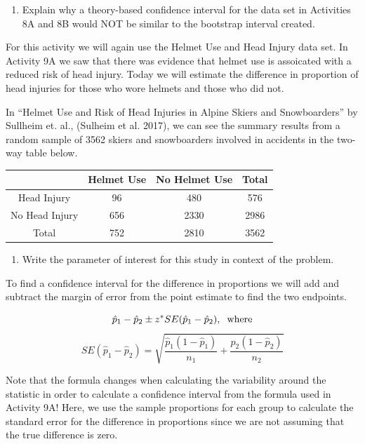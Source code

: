 \documentclass[
]{report}
\providecommand{\tightlist}{%
  \setlength{\itemsep}{0pt}\setlength{\parskip}{0pt}}
\begin{document}
\begin{enumerate}
\def\labelenumi{\arabic{enumi}.}
\tightlist
\item
  Explain why a theory-based confidence interval for the data set in Activities 8A and 8B would NOT be similar to the bootstrap interval created.
\end{enumerate}

\vspace{1in}

For this activity we will again use the Helmet Use and Head Injury data set. In Activity 9A we saw that there was evidence that helmet use is assoicated with a reduced risk of head injury. Today we will estimate the difference in proportion of head injuries for those who wore helmets and those who did not.

In ``Helmet Use and Risk of Head Injuries in Alpine Skiers and Snowboarders'' by Sullheim et. al., (Sulheim et al. 2017), we can see the summary results from a random sample of 3562 skiers and snowboarders involved in accidents in the two-way table below.

\begin{longtable}[]{@{}cccc@{}}
\toprule()
& Helmet Use & No Helmet Use & Total \\
\midrule()
\endhead
Head Injury & 96 & 480 & 576 \\
No Head Injury & 656 & 2330 & 2986 \\
Total & 752 & 2810 & 3562 \\
\bottomrule()
\end{longtable}

\begin{enumerate}
\def\labelenumi{\arabic{enumi}.}
\setcounter{enumi}{1}
\tightlist
\item
  Write the parameter of interest for this study in context of the problem.
\end{enumerate}

\vspace{0.8in}

To find a confidence interval for the difference in proportions we will add and subtract the margin of error from the point estimate to find the two endpoints.

\[\hat{p}_1-\hat{p}_2\pm z^*SE(\hat{p}_1-\hat{p}_2), \hspace{.2cm} \text{where}\]
\[SE(\hat{p}_1-\hat{p}_2) = \sqrt{\frac{\hat{p}_1 (1-\hat{p}_1)}{n_1}+\frac{\hat{p}_2 (1-\hat{p}_2)}{n_2}}\]

Note that the formula changes when calculating the variability around the statistic in order to calculate a confidence interval from the formula used in Activity 9A! Here, we use the sample proportions for each group to calculate the standard error for the difference in proportions since we are not assuming that the true difference is zero.
\end{document}

